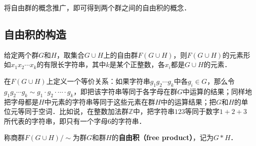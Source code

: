 
将自由群的概念推广，即可得到两个群之间的自由积的概念．

\subsection{自由积的构造}

给定两个群$G$和$H$，取集合$G\cup H$上的自由群$F(G\cup H)$，则$F(G\cup H)$的元素形如$x_1x_2\cdots x_k$的有限长字符串，其中$k$是某个正整数，各$x_i$都是$G\cup H$的元素．

在$F(G\cup H)$上定义一个等价关系：如果字符串$g_1g_2\cdots g_k$中各$g_i\in G$，那么令$g_1g_2\cdots g_k\sim g_1\cdot g_2\cdot\cdots\cdot g_k$，即把该字符串等同于各字母在群$G$中运算的结果；同样地把字母都是$H$中元素的字符串等同于这些元素在群$H$中的运算结果；把$G$和$H$的单位元等同于空词．比如说，在整数加法群$\mathbb{Z}$中，把字符串$123$等同于数字$1+2+3$所代表的字符串，即只有一个字母$6$的字符串．

称商群$F(G\cup H)/\sim$为群$G$和群$H$的\textbf{自由积（free product）}，记为$G*H$．

